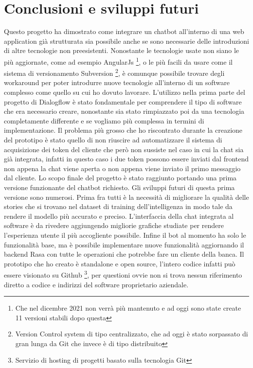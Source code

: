 \chapter{Conclusioni e sviluppi futuri}

Questo progetto ha dimostrato come integrare un chatbot all'interno di una web application già strutturata sia possibile anche se sono necessarie delle introduzioni di altre tecnologie non preesistenti. Nonostante le tecnologie usate non siano le più aggiornate, come ad esempio AngularJs \footnote{Che nel dicembre 2021 non verrà più mantenuto e ad oggi sono state create 11 versioni stabili dopo questa}, o le più facili da usare come il sistema di versionamento Subversion \footnote{Version Control system di tipo centralizzato, che ad oggi è stato sorpassato di gran lunga da Git che invece è di tipo distribuito}, è comunque possibile trovare degli workaround per poter introdurre nuove tecnologie all'interno di un software complesso come quello su cui ho dovuto lavorare.
L'utilizzo nella prima parte del progetto di Dialogflow è stato fondamentale per comprendere il tipo di software che era necessario creare, nonostante sia stato rimpiazzato poi da una tecnologia completamente differente e se vogliamo più complessa in termini di implementazione.
Il problema più grosso che ho riscontrato durante la creazione del prototipo è stato quello di non riuscire ad automatizzare il sistema di acquisizione dei token del cliente che però non sussiste nel caso in cui la chat sia già integrata, infatti in questo caso i due token possono essere inviati dal frontend non appena la chat viene aperta o non appena viene inviato il primo messaggio dal cliente.
Lo scopo finale del progetto è stato raggiunto portando una prima versione funzionante del chatbot richiesto. Gli sviluppi futuri di questa prima versione sono numerosi. Prima fra tutti è la necessità di migliorare la qualità delle stories che si trovano nel dataset di training dell'intelligenza in modo tale da rendere il modello più accurato e preciso. L'interfaccia della chat integrata al software è da rivedere aggiungendo migliorie grafiche studiate per rendere l'esperienza utente il più accogliente possibile. Infine il bot al momento ha solo le funzionalità base, ma è possibile implementare nuove funzionalità aggiornando il backend Rasa con tutte le operazioni che potrebbe fare un cliente della banca.
Il prototipo che ho creato è standalone e open source, l'intero codice infatti può essere visionato su Github \footnote{Servizio di hosting di progetti basato sulla tecnologia Git}, per questioni ovvie non si trova nessun riferimento diretto a codice e indirizzi del software proprietario aziendale.
